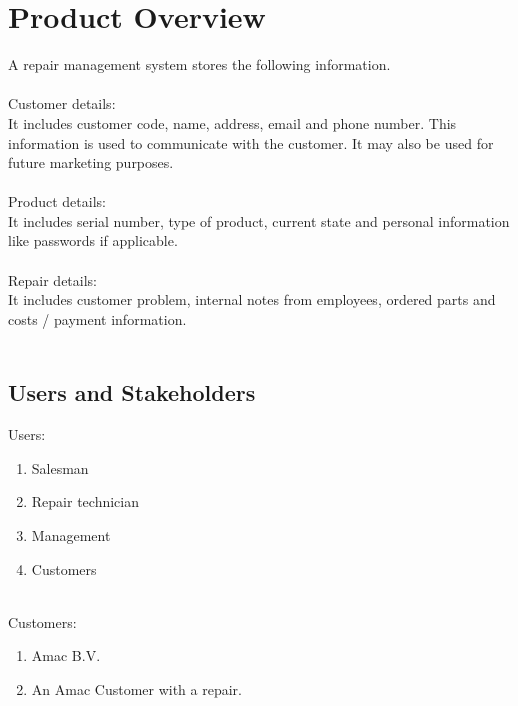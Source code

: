 \documentclass{article}
\begin{document}
\section{Product Overview}

A repair management system stores the following information.\\
\\
Customer details:\\
It includes customer code, name, address, email and phone number. This information is used to communicate with the customer. It may also be used for future marketing purposes.\\
\\
Product details:\\
It includes serial number, type of product, current state and personal information like passwords if applicable.\\
\\
Repair details:\\
It includes customer problem, internal notes from employees, ordered parts and costs / payment information.\\
\\


\subsection {Users and Stakeholders}
Users:
\begin{enumerate}
    \item Salesman
    \item Repair technician
    \item Management
    \item Customers
\end{enumerate}
\\
Customers:
\begin{enumerate}
    \item Amac B.V.
    \item An Amac Customer with a repair.
\end{enumerate}
\end{document}

